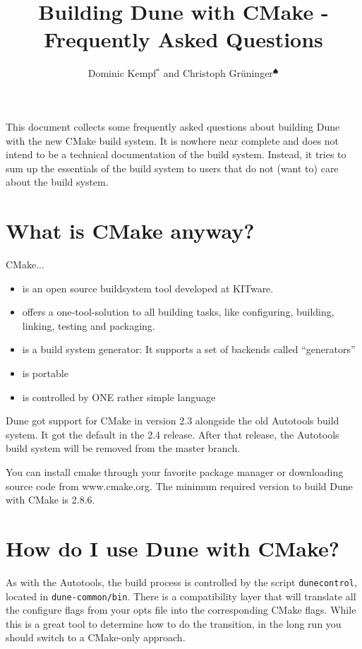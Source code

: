 \documentclass[a4paper,10pt,DIV9,headings=small]{scrartcl}
\title{Building Dune with CMake - Frequently Asked Questions}
\author{Dominic Kempf$^\ast$ and Christoph Grüninger$^\spadesuit$}
\newcommand{\dunecontrol}{\lstinline!dunecontrol!\xspace}
\begin{document}
\maketitle
\tableofcontents
\pagebreak

This document collects some frequently asked questions about building Dune with the new CMake build system. It is nowhere near complete and does not intend to be a technical documentation of the build system. Instead, it tries to sum up the essentials of the build system to users that do not (want to) care about the build system.

\section{What is CMake anyway?}
CMake...
 \begin{itemize}
  \item is an open source buildsystem tool developed at KITware.
  \item offers a one-tool-solution to all building tasks, like configuring, building, linking, testing and packaging.
  \item is a build system generator: It supports a set of backends called ``generators''
  \item is portable
  \item is controlled by ONE rather simple language
 \end{itemize}

Dune got support for CMake in version 2.3 alongside the old Autotools build system. It got the default in the
2.4 release. After that release, the Autotools build system will be removed from the master branch.

You can install cmake through your favorite package manager or downloading source code from www.cmake.org. The minimum required version to build Dune with CMake is 2.8.6.

\section{How do I use Dune with CMake?}

As with the Autotools, the build process is controlled by the script \dunecontrol, located in \lstinline!dune-common/bin!.
There is a compatibility layer that will translate all the configure flags from your opts file into the corresponding
CMake flags. While this is a great tool to determine how to do the transition, in the long run you should switch to
a CMake-only approach.
\end{document}
